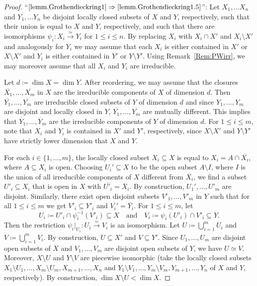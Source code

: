\documentclass[JEP,XML,SOM,Unicode,NoFloatCountersInSection,published]{cedram}
\newcommand\quand{\quad\text{and}\quad}
\theoremstyle{definition}
\newcommand\iso{\stackrel{\simeq}{\longrightarrow}}
\begin{document}
\begin{proof}
``$\eqref{lemm.Grothendieckring1}\Rightarrow \eqref{lemm.Grothendieckring1.5}$'':
Let $X_1, \ldots X_n$ and $Y_1, \ldots Y_n$ be disjoint locally closed subsets of $X$ and $Y$, respectively,
such that their union is equal to $X$ and $Y$, respectively, and such that there are isomorphisms
$\psi_i \colon X_i \iso Y_i$ for $1 \leq i \leq n$.
By replacing $X_i$ with $X_i \cap X'$ and $X_i \setminus X'$ and analogously for $Y_i$ we may assume
that each $X_i$ is either contained in $X'$ or $X \setminus X'$ and
$Y_i$ is either contained in $Y'$ or $Y \setminus Y'$.
Using Remark~\ref{Rem:PWirr}, we may moreover assume that all $X_i$ and $Y_i$ are irreducible.

Let $d \coloneqq \dim X = \dim Y$. After reordering, we may assume that the closures $\overline{X_1}, \ldots, \overline{X_m}$ in $X$ are
the irreducible components of $X$ of dimension $d$.
Then $\overline{Y_1}, \ldots, \overline{Y_m}$ are irreducible closed subsets of $Y$ of dimension $d$
and since $Y_1, \ldots, Y_m$ are disjoint and locally closed in $Y$,
$\overline{Y_1}, \ldots, \overline{Y_m}$ are mutually different. This
implies that $\overline{Y}_1, \ldots, \overline{Y}_m$ are the irreducible components of $Y$ of dimension $d$.
For $1 \leq i \leq m$, note that $X_i$ and $Y_i$ is contained in $X'$ and $Y'$, respectively, since $X \setminus X'$
and $Y \setminus Y'$ have strictly lower dimension that $X$ and $Y$.

For each $i\in\{1,\ldots,m\}$, the locally closed subset $X_i\subseteq X$ is equal to $X_i=A\cap \overline{X_i}$, where $A\subseteq X_i$ is open. Choosing $U_i'\subseteq X$ to be the open subset $A\setminus I$, where $I$ is the union of all
irreducible components of $X$ different from $\overline{X_i}$, we find a subset $U'_i \subseteq X_i$ that is open in $X$ with $\overline{U'_i} = \overline{X}_i$. By construction, $U_1', \ldots, U'_m$ are disjoint.
Similarly, there exist open disjoint subsets $V'_1, \ldots, V'_m$ in $Y$ such that
for all $1 \leq i \leq m$ we get $V'_i \subseteq Y'_i$ and $\overline{V_i'} = \overline{Y_i}$. For $1 \leq i \leq m$, let
\[
U_i \coloneqq U'_i \cap \psi_i^{-1}(V'_i) \subseteq X \quand
V_i \coloneqq \psi_i(U'_i) \cap V'_i \subseteq Y.
\]
Then the restriction $\psi_i |_{U_i} \colon U_i \iso V_i$ is an isomorphism.
Let $U \coloneqq \bigcup_{i=1}^m U_i$ and $V \coloneqq \bigcup_{i=1}^m V_i$.
By construction, $U \subseteq X'$ and $V \subseteq Y'$.
Since
$U_1, \ldots, U_m$ are disjoint open subsets of $X$ and
$V_1, \ldots, V_m$ are disjoint open subsets of $Y$, we have $U \simeq V$.
Moreover, $X \setminus U$ and $Y \setminus V$ are piecewise isomorphic
(take the locally closed subsets $X_1 \setminus U_1, \ldots, X_m \setminus U_m, X_{m+1}, \ldots, X_n$
and $Y_1 \setminus V_1, \ldots, Y_m \setminus V_m, Y_{m+1}, \ldots, Y_n$ of $X$ and $Y$,
respectively). By construction,
$\dim X \setminus U < \dim X$.


\end{proof}
\end{document}
